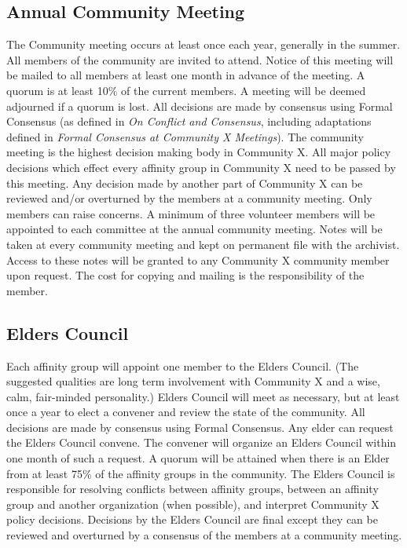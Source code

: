\subsection*{Annual Community Meeting}
The Community meeting occurs at least once each year, generally in the summer. All members of the community are invited to attend. Notice of this meeting will be mailed to all members at least one month in advance of the meeting. A quorum is at least 10\% of the current members. A meeting will be deemed adjourned if a quorum is lost. All decisions are made by consensus using Formal Consensus (as defined in \emph{On Conflict and Consensus}, including adaptations defined in \emph{Formal Consensus at Community X Meetings}). The community meeting is the highest decision making body in Community X. All major policy decisions which effect every affinity group in Community X need to be passed by this meeting. Any decision made by another part of Community X can be reviewed and/or overturned by the members at a community meeting. Only members can raise concerns. A minimum of three volunteer members will be appointed to each committee at the annual community meeting. Notes will be taken at every community meeting and kept on permanent file with the archivist. Access to these notes will be granted to any Community X community member upon request. The cost for copying and mailing is the responsibility of the member.

\subsection*{Elders Council}
Each affinity group will appoint one member to the Elders Council. (The suggested qualities are long term involvement with Community X and a wise, calm, fair-minded personality.) Elders Council will meet as necessary, but at least once a year to elect a convener and review the state of the community. All decisions are made by consensus using Formal Consensus. Any elder can request the Elders Council convene. The convener will organize an Elders Council within one month of such a request. A quorum will be attained when there is an Elder from at least 75\% of the affinity groups in the community. The Elders Council is responsible for resolving conflicts between affinity groups, between an affinity group and another organization (when possible), and interpret Community X policy decisions. Decisions by the Elders Council are final except they can be reviewed and overturned by a consensus of the members at a community meeting.


